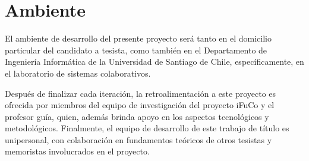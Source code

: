 \section{Ambiente}
\label{sec:ambiente}
El ambiente de desarrollo del presente proyecto será tanto en el domicilio particular del candidato a tesista, como también en el Departamento de Ingeniería Informática de la Universidad de Santiago de Chile, específicamente, en el laboratorio de sistemas colaborativos.

Después de finalizar cada iteración, la retroalimentación a este proyecto es ofrecida por miembros del equipo de investigación del proyecto iFuCo y el profesor guía, quien, además brinda apoyo en los aspectos tecnológicos y metodológicos. Finalmente, el equipo de desarrollo de este trabajo de título es unipersonal, con colaboración en fundamentos teóricos de otros tesistas y memoristas involucrados en el proyecto. 
